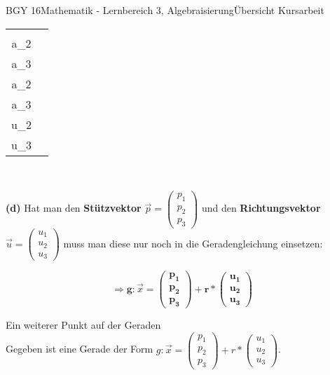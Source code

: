 \documentclass[oneside,openany,headings=optiontotoc,11pt,numbers=noenddot]{scrreprt}
\begin{document}
\begin{worksheet}{BGY 16}{Mathematik - Lernbereich 3, Algebraisierung}{Übersicht Kursarbeit}
\begin{framed}
\begin{tabularx}{\textwidth}{cc}
				\(\vec{p} = \underbrace{\left(\begin{array}{c}a_1\\a_2\\a_3\end{array}\right)}_{Stützvektor}\) & \(\Rightarrow \mathbf{g:} \vec{x} \mathbf{= \left(\begin{array}{c}a_1\\a_2\\a_3\end{array}\right) + r*\left(\begin{array}{c}u_1\\u_2\\u_3\end{array}\right)}\)
			\end{tabularx}\\
			\par\bigskip\noindent
			\textbf{(d)} Hat man den \textbf{Stützvektor} \(\vec{p} = \left(\begin{array}{c}p_1\\p_2\\p_3\end{array}\right)\) und den \textbf{Richtungsvektor} \(\vec{u} = \left(\begin{array}{c}u_1\\u_2\\u_3\end{array}\right)\) muss man diese nur noch in die Geradengleichung einsetzen:\\
			\par\noindent
			\[\Rightarrow \mathbf{g:} \vec{x} \mathbf{= \left(\begin{array}{c}p_1\\p_2\\p_3\end{array}\right) + r*\left(\begin{array}{c}u_1\\u_2\\u_3\end{array}\right)}\]
		\end{framed}
		\begin{framed}
			\noindent
			\tiny{\color{codegray}Ein weiterer Punkt auf der Geraden}\normalcolor\normalsize\\
			Gegeben ist eine Gerade der Form \(g: \vec{x} = \left(\begin{array}{c}p_1\\p_2\\p_3\end{array}\right) + r*\left(\begin{array}{c}u_1\\u_2\\u_3\end{array}\right)\).\\

\end{framed}
\end{worksheet}
\end{document}
